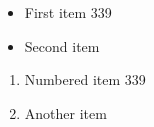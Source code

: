 \documentclass{article}
\begin{document}
\begin{itemize}
\item First item 339
\item Second item
\end{itemize}
\begin{enumerate}
\item Numbered item 339
\item Another item
\end{enumerate}
\end{document}
